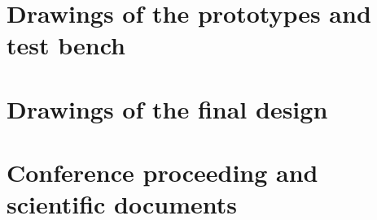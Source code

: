 \chapter{Drawings of the prototypes and test bench}








\chapter{Drawings of the final design}

\chapter{Conference proceeding and scientific documents}
